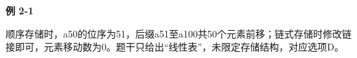 {\color{ink}\bfseries 例 2-1}\par\vspace{1bp}顺序存储时，a50的位序为51，后缀a51至a100共50个元素前移；链式存储时修改链接即可，元素移动数为0。题干只给出“线性表”，未限定存储结构，对应选项D。

